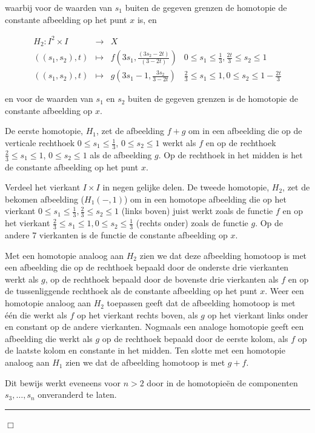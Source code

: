 \documentclass[12pt]{book}
\newcommand{\B}{\rule{1mm}{0mm} \hfill $\Box$ }
\begin{document}
waarbij voor de waarden van $s_1$ buiten de gegeven grenzen de homotopie de constante afbeelding op
het punt $x$ is, en

$$\begin{array}{rcll} H_2: I^{2}\times I & \to & X\\
((s_1,s_2),t) & \mapsto & f(3s_1, \frac{(3s_2-2t)}{(3-2t)}) & 0\leq s_1\leq \frac{1}{3},
\frac{2t}{3}\leq s_2\leq 1\\
 ((s_1,s_2),t) & \mapsto & g(3s_1-1, \frac{3s_2}{3-2t}) & \frac{2}{3}\leq s_1\leq 1, 0\leq s_2\leq
1-\frac{2t}{3}\end{array}$$

en voor de waarden van $s_1$ en $s_2$ buiten de gegeven grenzen is de homotopie de constante
afbeelding op $x$.

De eerste homotopie, $H_1$, zet de afbeelding $f+g$ om in een afbeelding die op de verticale
rechthoek $0\leq s_1\leq \frac{1}{3}$, $0\leq s_2\leq 1$ werkt als $f$ en op de rechthoek
$\frac{2}{3}\leq s_1\leq 1$, $0\leq s_2\leq 1$ als de afbeelding $g$. Op de rechthoek in het midden is het de constante afbeelding op het punt $x$.

Verdeel het vierkant $I\times I$ in negen
gelijke delen. De tweede homotopie, $H_2$, zet de bekomen afbeelding ($H_1(-,1)$) om in een homotope afbeelding
die op het vierkant $0\leq s_1\leq \frac{1}{3}, \frac{2}{3}\leq s_2\leq 1$ (links
boven) juist werkt zoals de functie $f$ en op het vierkant $\frac{2}{3}\leq s_1\leq 1, 0\leq s_2\leq
\frac{1}{3}$ (rechts onder) zoals de functie $g$. Op de andere 7 vierkanten is de functie de
constante afbeelding op $x$.

Met een homotopie analoog aan $H_2$ zien we dat deze afbeelding homotoop is met een afbeelding die
op de rechthoek bepaald door de onderste drie vierkanten werkt als $g$, op de rechthoek bepaald door
de bovenste drie vierkanten als $f$ en op de tussenliggende rechthoek als de constante afbeelding op
het punt $x$. Weer een homotopie analoog aan $H_2$ toepassen geeft dat de afbeelding homotoop is met
\'e\'en die werkt als $f$ op het vierkant rechts boven, als $g$ op het vierkant links onder en
constant op de andere vierkanten. Nogmaals een analoge homotopie geeft een afbeelding die werkt als
$g$ op de rechthoek bepaald door de eerste kolom, als $f$ op de laatste kolom en constante in het
midden. Ten slotte met een homotopie analoog aan $H_1$ zien we dat de afbeelding homotoop is met
$g+f$.

Dit bewijs werkt eveneens voor $n>2$ door in de homotopie\"en  de componenten $s_3,
\ldots ,s_n$  onveranderd te laten.
\B
\end{document}
